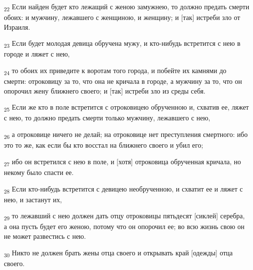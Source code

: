 \begin{tcolorbox}
\textsubscript{22} Если найден будет кто лежащий с женою замужнею, то должно предать смерти обоих: и мужчину, лежавшего с женщиною, и женщину; и [так] истреби зло от Израиля.
\end{tcolorbox}
\begin{tcolorbox}
\textsubscript{23} Если будет молодая девица обручена мужу, и кто-нибудь встретится с нею в городе и ляжет с нею,
\end{tcolorbox}
\begin{tcolorbox}
\textsubscript{24} то обоих их приведите к воротам того города, и побейте их камнями до смерти: отроковицу за то, что она не кричала в городе, а мужчину за то, что он опорочил жену ближнего своего; и [так] истреби зло из среды себя.
\end{tcolorbox}
\begin{tcolorbox}
\textsubscript{25} Если же кто в поле встретится с отроковицею обрученною и, схватив ее, ляжет с нею, то должно предать смерти только мужчину, лежавшего с нею,
\end{tcolorbox}
\begin{tcolorbox}
\textsubscript{26} а отроковице ничего не делай; на отроковице нет преступления смертного: ибо это то же, как если бы кто восстал на ближнего своего и убил его;
\end{tcolorbox}
\begin{tcolorbox}
\textsubscript{27} ибо он встретился с нею в поле, и [хотя] отроковица обрученная кричала, но некому было спасти ее.
\end{tcolorbox}
\begin{tcolorbox}
\textsubscript{28} Если кто-нибудь встретится с девицею необрученною, и схватит ее и ляжет с нею, и застанут их,
\end{tcolorbox}
\begin{tcolorbox}
\textsubscript{29} то лежавший с нею должен дать отцу отроковицы пятьдесят [сиклей] серебра, а она пусть будет его женою, потому что он опорочил ее; во всю жизнь свою он не может развестись с нею.
\end{tcolorbox}
\begin{tcolorbox}
\textsubscript{30} Никто не должен брать жены отца своего и открывать край [одежды] отца своего.
\end{tcolorbox}
